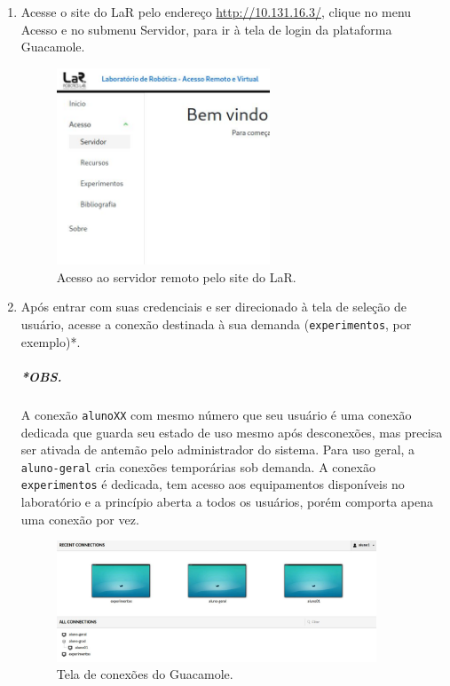 \documentclass[12pt]{article}
\begin{document}
\begin{enumerate}[font=\bfseries]
    \item Acesse o site do LaR pelo endereço \url{http://10.131.16.3/}, clique no menu Acesso e no submenu Servidor, para ir à tela de login da plataforma Guacamole.
    
    \begin{figure}[H]
    \centering
    \includegraphics[width=0.6\textwidth]{img/site-lar.jpg}
    \caption{\label{ref:site-lar}Acesso ao servidor remoto pelo site do LaR.}
    \end{figure}
    
    \pagebreak
    
    \item Após entrar com suas credenciais e ser direcionado à tela de seleção de usuário, acesse a conexão destinada à sua demanda (\verb|experimentos|, por exemplo)*.
    
    \subparagraph{*OBS.} A conexão \verb|alunoXX| com mesmo número que seu usuário é uma conexão dedicada que guarda seu estado de uso mesmo após desconexões, mas precisa ser ativada de antemão pelo administrador do sistema.
    Para uso geral, a \verb|aluno-geral| cria conexões temporárias sob demanda.
    A conexão \verb|experimentos| é dedicada, tem acesso aos equipamentos disponíveis no laboratório e a princípio aberta a todos os usuários, porém comporta apena uma conexão por vez.
    
    \begin{figure}[H]
    \centering
    \includegraphics[width=0.9\textwidth]{img/conexao-guaca.jpg}
    \caption{\label{ref:conexao-guaca}Tela de conexões do Guacamole.}
    \end{figure}
    

\end{enumerate}
\end{document}
